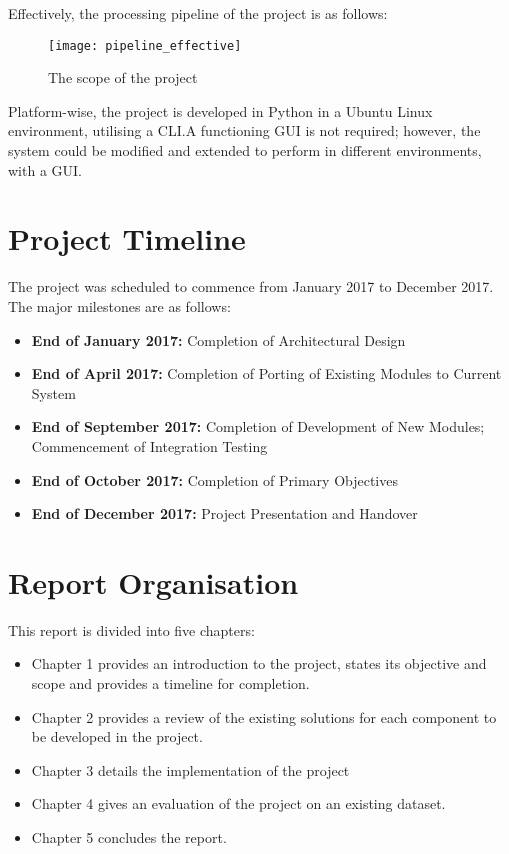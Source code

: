 Effectively, the processing pipeline of the project is as follows:

\begin{figure}[h]
\begin{center}
    \texttt{[image: pipeline\_effective]}
    \caption{The scope of the project}
\end{center}
\end{figure}
    
Platform-wise, the project is developed in Python in a Ubuntu Linux environment,
utilising a CLI.\@ A functioning GUI is not required; however, the system could
be modified and extended to perform in different environments, with a GUI\@.

\section{Project Timeline}

The project was scheduled to commence from January 2017 to December 2017. The major
milestones are as follows:

\begin{itemize}
    \item \textbf{End of January 2017:} Completion of Architectural Design
    \item \textbf{End of April 2017:} Completion of Porting of Existing Modules
    to Current System
    \item \textbf{End of September 2017:} Completion of Development of New Modules;
    Commencement of Integration Testing
    \item \textbf{End of October 2017:} Completion of Primary Objectives
    \item \textbf{End of December 2017:} Project Presentation and Handover
\end{itemize}

\section{Report Organisation}

This report is divided into five chapters:

\begin{itemize}
    \item Chapter 1 provides an introduction to the project, states its objective
    and scope and provides a timeline for completion.
    \item Chapter 2 provides a review of the existing solutions for each component
    to be developed in the project.
    \item Chapter 3 details the implementation of the project
    \item Chapter 4 gives an evaluation of the project on an existing dataset.
    \item Chapter 5 concludes the report.
\end{itemize}